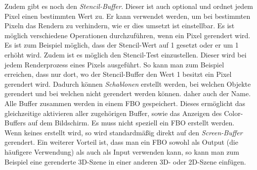 Zudem gibt es noch den \textit{Stencil-Buffer}. Dieser ist auch optional und ordnet jedem Pixel einen bestimmten Wert zu. Er kann verwendet werden, um bei bestimmten Pixeln das Rendern zu verhindern, wie er dies umsetzt ist einstellbar. Es ist möglich verschiedene Operationen durchzuführen, wenn ein Pixel gerendert wird. Es ist zum Beispiel möglich, dass der Stencil-Wert auf 1 gesetzt oder er um 1 erhöht wird. Zudem ist es möglich den Stencil-Test einzustellen. Dieser wird bei jedem Renderprozess eines Pixels ausgeführt. So kann man zum Beispiel erreichen, dass nur dort, wo der Stencil-Buffer den Wert 1 besitzt ein Pixel gerendert wird. Dadurch können \textit{Schablonen} erstellt werden, bei welchen Objekte gerendert und bei welchen nicht gerendert werden können. daher auch der Name.  
Alle Buffer zusammen werden in einem \ac{FBO} gespeichert. Dieses ermöglicht das gleichzeitige aktivieren aller zugehörigen Buffer, sowie das Anzeigen des Color-Buffers auf dem Bildschirm. Es muss nicht speziell ein \ac{FBO} erstellt werden. Wenn keines erstellt wird, so wird standardmäßig direkt auf den \textit{Screen-Buffer} gerendert. Ein weiterer Vorteil ist, dass man ein \ac{FBO} sowohl als Output (die häufigere Verwendung) als auch als Input verwenden kann, so kann man zum Beispiel eine gerenderte 3D-Szene in einer anderen 3D- oder 2D-Szene einfügen.  

